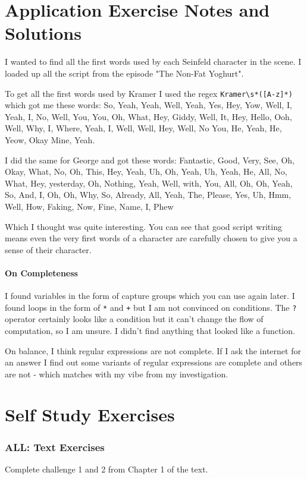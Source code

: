 \documentclass[twoside=false, DIV=14]{scrartcl}
\begin{document}
\newpage
\part*{Application Exercise Notes and Solutions}
I wanted to find all the first words used by each Seinfeld character in the scene.  I loaded up all the script from the episode "The Non-Fat Yoghurt".

To get all the first words used by Kramer I used the regex \verb|Kramer\s*([A-z]*)| which got me these words: So, Yeah, Yeah, Well, Yeah, Yes, Hey, Yow, Well, I, Yeah, I, No, Well, You, You, Oh, What, Hey, Giddy, Well, It, Hey, Hello, Ooh, Well, Why, I, Where, Yeah, I, Well, Well, Hey, Well, No
You, He, Yeah, He, Yeow, Okay
Mine, Yeah.

I did the same for George and got these words: Fantastic, Good, Very, See, Oh, Okay, What, No, Oh, This, Hey, Yeah, Uh, Oh, Yeah, Uh, Yeah, He, All, No, What, Hey, yesterday, Oh, Nothing, Yeah, Well, with, You, All, Oh, Oh, Yeah, So, And, I, Oh, Oh, Why, So, Already, All, Yeah, The, Please, Yes, Uh, Hmm, Well, How, Faking, Now, Fine, Name, I, Phew

Which I thought was quite interesting.  You can see that good script writing means even the very first words of a character are carefully chosen to give you a sense of their character.  

\subsection*{On Completeness}
I found variables in the form of capture groups which you can use again later.  I found loops in the form of \verb|*| and \verb|+| but I am not convinced on conditions.  The \verb|?| operator certainly looks like a condition but it can't change the flow of computation, so I am unsure.  I didn't find anything that looked like a function.

On balance, I think regular expressions are not complete.  If I ask the internet for an answer I find out some variants of regular expressions are complete and others are not - which matches with my vibe from my investigation.
\newpage
\part*{Self Study Exercises}
\section*{ALL: Text Exercises}
Complete challenge 1 and 2 from  Chapter 1 of the text.
\end{document}
